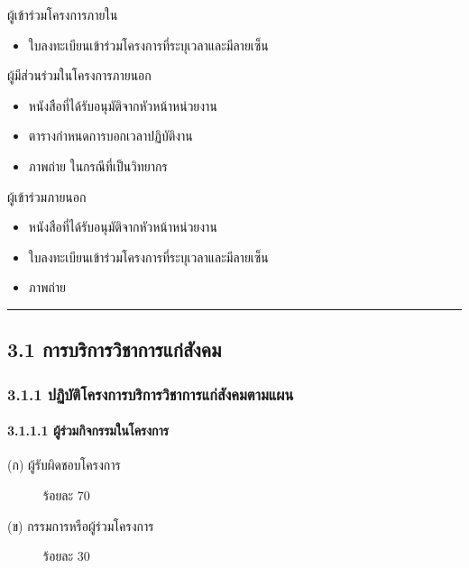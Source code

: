 \documentclass[a4paper,12pt,english]{sphinxmanual}
\begin{document}
ผู้เข้าร่วมโครงการภายใน
\begin{itemize}
\item {} 
ใบลงทะเบียนเข้าร่วมโครงการที่ระบุเวลาและมีลายเซ็น

\end{itemize}

ผู้มีส่วนร่วมในโครงการภายนอก
\begin{itemize}
\item {} 
หนังสือที่ได้รับอนุมัติจากหัวหน้าหน่วยงาน 

\item {} 
ตารางกำหนดการบอกเวลาปฏิบัติงาน

\item {} 
ภาพถ่าย ในกรณีที่เป็นวิทยากร

\end{itemize}

ผู้เข้าร่วมภายนอก
\begin{itemize}
\item {} 
หนังสือที่ได้รับอนุมัติจากหัวหน้าหน่วยงาน 

\item {} 
ใบลงทะเบียนเข้าร่วมโครงการที่ระบุเวลาและมีลายเซ็น

\item {} 
ภาพถ่าย

\end{itemize}


\bigskip\hrule\bigskip



\subsection{3.1 การบริการวิชาการแก่สังคม}
\label{\detokenize{workload_rubric:id55}}

\subsubsection{3.1.1 ปฏิบัติโครงการบริการวิชาการแก่สังคมตามแผน}
\label{\detokenize{workload_rubric:id56}}

\paragraph{3.1.1.1 ผู้ร่วมกิจกรรมในโครงการ}
\label{\detokenize{workload_rubric:id57}}\begin{description}
\item[{(ก) ผู้รับผิดชอบโครงการ}] \leavevmode
ร้อยละ 70

\item[{(ข) กรรมการหรือผู้ร่วมโครงการ}] \leavevmode
ร้อยละ 30

\end{description}
\end{document}

